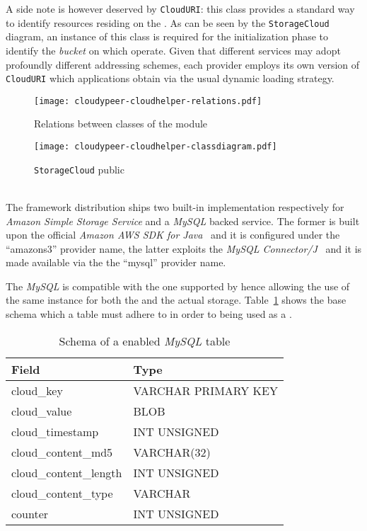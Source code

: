 A side note is however deserved by \texttt{CloudURI}: this
class provides a standard way to identify resources residing on the
\cloud. As can be seen by the \texttt{StorageCloud} diagram, an
instance of this class is required for the initialization phase to
identify the \textit{bucket} on which operate. Given that different
\cloud services may adopt profoundly different addressing schemes,
each \cloudhelper provider employs its own version of
\texttt{CloudURI} which applications obtain via the usual dynamic
loading strategy.

\begin{figure}[h!]
  \centering
  \texttt{[image: cloudypeer-cloudhelper-relations.pdf]}
  \caption{Relations between classes of the \cloudhelper module}
  \label{fig:cloudypeer-cloudhelper-relations}
\end{figure}

\begin{figure}[h!]
  \centering
  \texttt{[image: cloudypeer-cloudhelper-classdiagram.pdf]}
  \caption{\texttt{StorageCloud} public \api}
  \label{fig:cloudypeer-cloudhelper-class}
\end{figure}

\ \\
The framework distribution ships two built-in \cloudhelper implementation
respectively for \textit{Amazon Simple Storage Service} and a
\textit{MySQL} backed \cloud service. The former is built upon
the official \textit{Amazon AWS SDK for Java}~\cite{AWS4Java} and it is
configured under the ``amazons3'' provider name, the latter
exploits the \textit{MySQL Connector/J}~\cite{MySQLConnectorJava} and
it is made available via the the ``mysql'' provider name.

The \textit{MySQL} \cloud is compatible with the one supported by
\grapes hence allowing the use of the same instance for both the
\peersampling and the actual storage. Table~\ref{tbl:mysql-cloud}
shows the base schema which a table must adhere to in order to being
used as a \cloud.

\begin{table}[H]
  \centering
  \begin{tabular}{|l|l|}
  \hline
  Field & Type \\
  \hline
  \hline
  cloud\_key & VARCHAR PRIMARY KEY \\
  cloud\_value & BLOB \\
  cloud\_timestamp &  INT UNSIGNED \\
  cloud\_content\_md5 &  VARCHAR(32) \\
  cloud\_content\_length &  INT UNSIGNED \\
  cloud\_content\_type & VARCHAR \\
  counter & INT UNSIGNED \\
  \hline
  \end{tabular}
  \caption{Schema of a \cloud enabled \textit{MySQL} table}
  \label{tbl:mysql-cloud}
\end{table}

